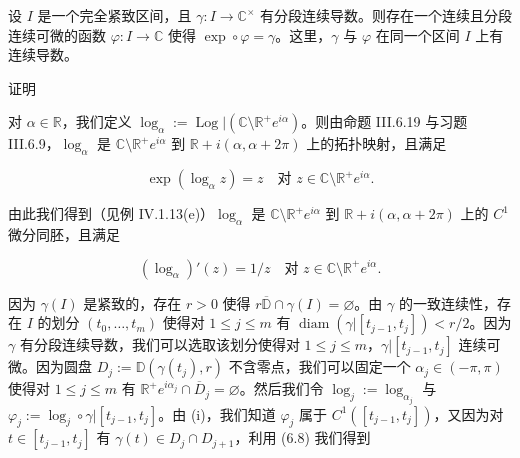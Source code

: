 \begin{lemma}

设 $ I $ 是一个完全紧致区间，且 $ \gamma : I \to \mathbb{C}^{\times} $ 有分段连续导数。则存在一个连续且分段连续可微的函数 $ \varphi : I \to \mathbb{C} $ 使得 $ \exp\circ\varphi = \gamma $。这里，$ \gamma $ 与 $ \varphi $ 在同一个区间 $ I $ 上有连续导数。

证明

\begin{subitems}
\item

对 $ \alpha \in \mathbb{R} $，我们定义 $ \log_{\alpha} := \operatorname{Log}|\left(\mathbb{C}\setminus\mathbb{R}^{+}e^{i\alpha}\right) $。则由命题 III.6.19 与习题 III.6.9，$ \log_{\alpha} $ 是 $ \mathbb{C}\setminus\mathbb{R}^{+}e^{i\alpha} $ 到 $ \mathbb{R} + i(\alpha,\alpha + 2\pi) $ 上的拓扑映射，且满足

\begin{equation}
\exp(\log_{\alpha}z) = z \quad \text{对 } z \in \mathbb{C}\setminus\mathbb{R}^{+}e^{i\alpha} .\tag{6.8}
\end{equation}

由此我们得到（见例 IV.1.13(e)）$ \log_{\alpha} $ 是 $ \mathbb{C}\setminus\mathbb{R}^{+}e^{i\alpha} $ 到 $ \mathbb{R} + i(\alpha,\alpha + 2\pi) $ 上的 $ C^{1} $ 微分同胚，且满足

\begin{equation}
(\log_{\alpha})'(z) = 1/z \quad \text{对 } z \in \mathbb{C}\setminus\mathbb{R}^{+}e^{i\alpha} .\tag{6.9}
\end{equation}
\item

因为 $ \gamma(I) $ 是紧致的，存在 $ r > 0 $ 使得 $ r\overline{\mathbb{D}}\cap\gamma(I) = \varnothing $。由 $ \gamma $ 的一致连续性，存在 $ I $ 的划分 $ (t_{0},\ldots,t_{m}) $ 使得对 $ 1 \le j \le m $ 有 $ \operatorname{diam}\left(\gamma|[t_{j-1},t_{j}]\right) < r/2 $。因为 $ \gamma $ 有分段连续导数，我们可以选取该划分使得对 $ 1 \le j \le m $，$ \gamma|[t_{j-1},t_{j}] $ 连续可微。因为圆盘 $ D_{j} := \mathbb{D}(\gamma(t_{j}),r) $ 不含零点，我们可以固定一个 $ \alpha_{j} \in (-\pi,\pi) $ 使得对 $ 1 \le j \le m $ 有 $ \mathbb{R}^{+}e^{i\alpha_{j}}\cap\overline{D}_{j} = \varnothing $。然后我们令 $ \log_{j} := \log_{\alpha_{j}} $ 与 $ \varphi_{j} := \log_{j}\circ\gamma|[t_{j-1},t_{j}] $。由 (i)，我们知道 $ \varphi_{j} $ 属于 $ C^{1}\left([t_{j-1},t_{j}]\right) $，又因为对 $ t \in [t_{j-1},t_{j}] $ 有 $ \gamma(t) \in D_{j}\cap D_{j+1} $，利用 (6.8) 我们得到


\end{subitems}
\end{lemma}
